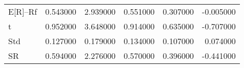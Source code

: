 \begin{tabular}{lrrrrr}
\toprule
\midrule
E[R]--Rf & 0.543000 & 2.939000 & 0.551000 & 0.307000 & -0.005000 \\
t & 0.952000 & 3.648000 & 0.914000 & 0.635000 & -0.707000 \\
Std & 0.127000 & 0.179000 & 0.134000 & 0.107000 & 0.074000 \\
SR & 0.594000 & 2.276000 & 0.570000 & 0.396000 & -0.441000 \\
\bottomrule
\end{tabular}
